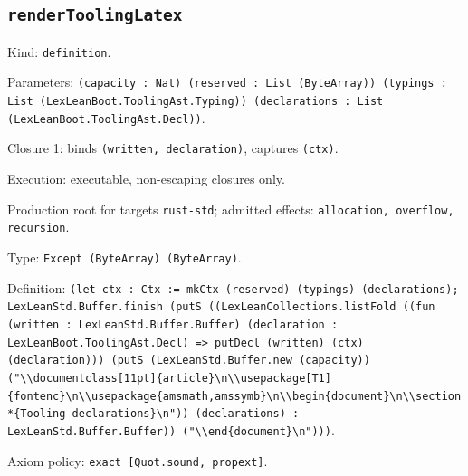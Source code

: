 \documentclass[11pt]{article}
\begin{document}
\subsection*{\texttt{renderToolingLatex}}
\noindent Kind: \texttt{definition}.\par
\noindent Parameters: \texttt{(capacity : Nat) (reserved : List (ByteArray)) (typings : List (LexLeanBoot.ToolingAst.Typing)) (declarations : List (LexLeanBoot.ToolingAst.Decl))}.\par
\noindent Closure 1: binds \texttt{(written, declaration)}, captures \texttt{(ctx)}.\par
\noindent Execution: executable, non-escaping closures only.\par
\noindent Production root for targets \texttt{rust-std}; admitted effects: \texttt{allocation, overflow, recursion}.\par
\noindent Type: \texttt{Except (ByteArray) (ByteArray)}.\par
\noindent Definition: \texttt{(let ctx : Ctx := mkCtx (reserved) (typings) (declarations); LexLeanStd.Buffer.finish (putS ((LexLeanCollections.listFold ((fun (written : LexLeanStd.Buffer.Buffer) (declaration : LexLeanBoot.ToolingAst.Decl) => putDecl (written) (ctx) (declaration))) (putS (LexLeanStd.Buffer.new (capacity)) ("\textbackslash{}\textbackslash{}documentclass[11pt]\{article\}\textbackslash{}n\textbackslash{}\textbackslash{}usepackage[T1]\{fontenc\}\textbackslash{}n\textbackslash{}\textbackslash{}usepackage\{amsmath,amssymb\}\textbackslash{}n\textbackslash{}\textbackslash{}begin\{document\}\textbackslash{}n\textbackslash{}\textbackslash{}section*\{Tooling declarations\}\textbackslash{}n")) (declarations) : LexLeanStd.Buffer.Buffer)) ("\textbackslash{}\textbackslash{}end\{document\}\textbackslash{}n")))}.\par
\noindent Axiom policy: \texttt{exact [Quot.sound, propext]}.\par
\end{document}
